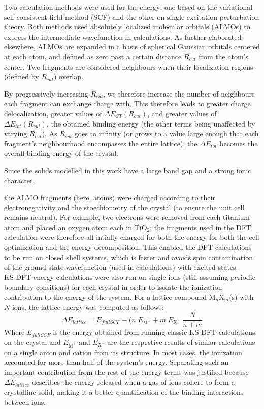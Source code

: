 \documentclass[aps,prb,twocolumn,amsmath,amssymb,superscriptaddress,longbibliography]{revtex4-1}
\begin{document}
Two calculation methods were used for the energy; one based on the variational self-consistent field method (SCF) and the other on single excitation perturbation theory\cite{xpt}. 
Both methods used absolutely localized molecular orbitals (ALMOs) to express the intermediate wavefunction in calculations. 
As further elaborated elsewhere, ALMOs are expanded in a basis of spherical Gaussian orbitals centered at each atom, and defined as zero past a certain distance $R_{cut}$ from the atom's center. 
Two fragments are considered neighbours when their localization regions (defined by $R_{cut}$) overlap.

By progressively increasing $R_{cut}$, we therefore increase the number of neighbours each fragment can exchange charge with. 
This therefore leads to greater charge delocalization, greater values of $\Delta E_{CT}\left(R_{cut}\right)$, and greater values of $\Delta E_{tot}\left(R_{cut}\right)$, the obtained binding energy (the other terms being unaffected by varying $R_{cut}$). 
As $R_{cut}$ goes to infinity (or grows to a value large enough that each fragment's neighbourhood encompasses the entire lattice), the $\Delta E_{tot}$ becomes the overall binding energy of the crystal.

Since the solids modelled in this work have a large band gap and a strong ionic character, 

the ALMO fragments (here, atoms) were charged according to their electronegativity and the stoechiometry of the crystal (to ensure the unit cell remains neutral). 
For example, two electrons were removed from each titanium atom and placed an oxygen atom each in $\text{TiO}_{2}$; the fragments used in the DFT calculation were therefore all intially charged for both the energy for both the cell optimization and the energy decomposition. 
This enabled the DFT calculations to be run on closed shell systems, which is faster and avoids spin contamination of the ground state wavefunction (used in calculations) with excited states.\\


KS-DFT energy calculations were also run on single ions (still assuming periodic boundary consitions) for each crystal in order to isolate the ionization contribution to the energy of the system. 
For a lattice compound $\text{M}_{n}\text{X}_{m}$(s) with $N$ ions, the lattice energy was computed as follows: 
\begin{equation*}
\Delta E_{lattice} = E_{full SCF} - (n\; E_{\text{M}^{+}} + m\; E_{\text{X}^{-}}\;\frac{N}{n+m}
\end{equation*} 
Where $E_{full SCF}$ is the energy obtained from running classic KS-DFT calculations on the crystal and $E_{\text{M}^{+}}$ and $E_{\text{X}^{-}}$ are the respective results of similar calculations on a single anion and cation from its structure. 
In most cases, the ionization accounted for more than half of the system's energy. 
Separating such an important contribution from the rest of the energy terms was justified because $\Delta E_{lattice}$ describes the energy released when a gas of ions cohere to form a crystalline solid, making it a better quantification of the binding interactions between ions.
\end{document}
